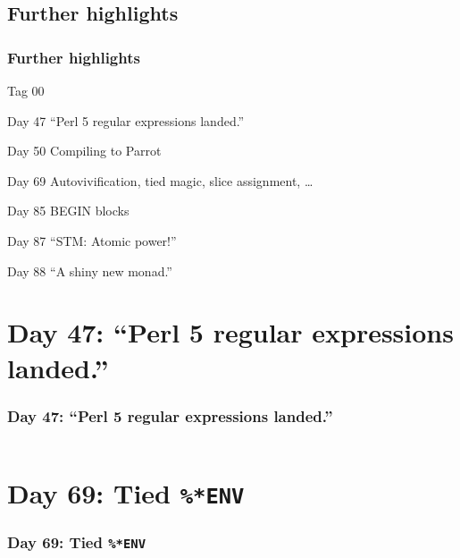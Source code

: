\documentclass[12pt,compress,english,utf8,t]{beamer}
\begin{document}
\subsection{Further highlights}

\begin{frame}[label=further-highlights]\frametitle{Further highlights}
  \begin{Mdescription}{Tag 00}
    \item[Day 47] ``Perl 5 regular expressions landed.''
    \hyperlink{perl5re}{}

    \item[Day 50] Compiling to Parrot

    \item[Day 69] Autovivification, tied magic, slice
    assignment, \ldots{} \hyperlink{tied-env}{}

    \item[Day 85] BEGIN blocks
    \hyperlink{begin-blocks}{}

    \item[Day 87] ``STM: Atomic power!''
    \hyperlink{stm}{}

    \item[Day 88] ``A shiny new monad.''
    \hyperlink{shiny-monad}{}
  \end{Mdescription}
\end{frame}


\appendix

\section{Day 47: ``Perl 5 regular expressions landed.''}

\begin{frame}[label=perl5re]\frametitle{Day 47: ``Perl 5 regular expressions landed.''}
  \inputminted{text}{code-snippets/day47-regex.pl}

  \hyperlink{further-highlights}{}
\end{frame}

\section{Day 69: Tied \texttt{\%*ENV}}

\begin{frame}[label=tied-env]\frametitle{Day 69: Tied \texttt{\%*ENV}}
  \inputminted{haskell}{code-snippets/day69-ast.hs}

  \hyperlink{further-highlights}{}
\end{frame}
\end{document}
